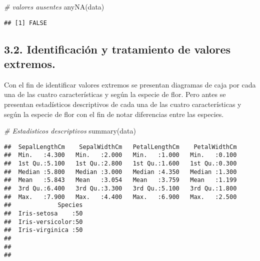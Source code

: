 \documentclass[
]{article}
\newenvironment{Shaded}{\begin{snugshade}}{\end{snugshade}}
\newcommand{\CommentTok}[1]{\textcolor[rgb]{0.56,0.35,0.01}{\textit{#1}}}
\newcommand{\FunctionTok}[1]{\textcolor[rgb]{0.00,0.00,0.00}{#1}}
\newcommand{\NormalTok}[1]{#1}
\newcommand{\SpecialCharTok}[1]{\textcolor[rgb]{0.00,0.00,0.00}{#1}}
\begin{document}
\begin{Shaded}
\begin{Highlighting}[]
\CommentTok{\# valores ausentes}
\FunctionTok{anyNA}\NormalTok{(data)}
\end{Highlighting}
\end{Shaded}

\begin{verbatim}
## [1] FALSE
\end{verbatim}

\hypertarget{identificaciuxf3n-y-tratamiento-de-valores-extremos.}{%
\subsection{3.2. Identificación y tratamiento de valores
extremos.}\label{identificaciuxf3n-y-tratamiento-de-valores-extremos.}}

Con el fin de identificar valores extremos se presentan diagramas de
caja por cada una de las cuatro características y según la especie de
flor. Pero antes se presentan estadísticos descriptivos de cada una de
las cuatro características y según la especie de flor con el fin de
notar diferencias entre las especies.

\begin{Shaded}
\begin{Highlighting}[]
\CommentTok{\# Estadisticos descriptivos}
\FunctionTok{summary}\NormalTok{(data)}
\end{Highlighting}
\end{Shaded}

\begin{verbatim}
##  SepalLengthCm    SepalWidthCm   PetalLengthCm    PetalWidthCm  
##  Min.   :4.300   Min.   :2.000   Min.   :1.000   Min.   :0.100  
##  1st Qu.:5.100   1st Qu.:2.800   1st Qu.:1.600   1st Qu.:0.300  
##  Median :5.800   Median :3.000   Median :4.350   Median :1.300  
##  Mean   :5.843   Mean   :3.054   Mean   :3.759   Mean   :1.199  
##  3rd Qu.:6.400   3rd Qu.:3.300   3rd Qu.:5.100   3rd Qu.:1.800  
##  Max.   :7.900   Max.   :4.400   Max.   :6.900   Max.   :2.500  
##             Species  
##  Iris-setosa    :50  
##  Iris-versicolor:50  
##  Iris-virginica :50  
##                      
##                      
## 
\end{verbatim}

\begin{Shaded}
\end{Shaded}
\end{document}

